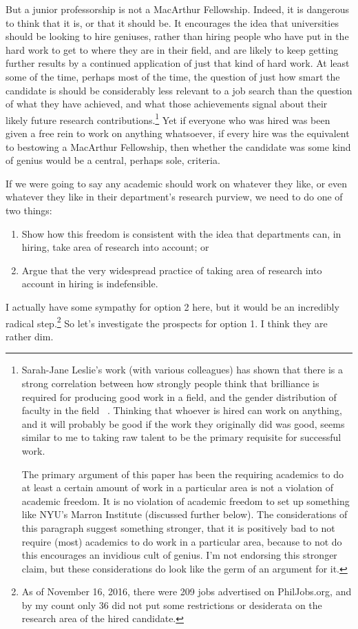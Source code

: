 But a junior professorship is not a MacArthur Fellowship. Indeed, it is dangerous to think that it is, or that it should be. It encourages the idea that universities should be looking to hire geniuses, rather than hiring people who have put in the hard work to get to where they are in their field, and are likely to keep getting further results by a continued application of just that kind of hard work. At least some of the time, perhaps most of the time, the question of just how smart the candidate is should be considerably less relevant to a job search than the question of what they have achieved, and what those achievements signal about their likely future research contributions.\footnote{Sarah-Jane Leslie's work (with various colleagues) has shown that there is a strong correlation between how strongly people think that brilliance is required for producing good work in a field, and the gender distribution of faculty in the field ~\citep{LeslieScience2015, LeslieFrontiers2015, LesliePLOS2016}. Thinking that whoever is hired can work on anything, and it will probably be good if the work they originally did was good, seems similar to me to taking raw talent to be the primary requisite for successful work.

The primary argument of this paper has been the requiring academics to do at least a certain amount of work in a particular area is not a violation of academic freedom. It is no violation of academic freedom to set up something like NYU's Marron Institute (discussed further below). The considerations of this paragraph suggest something stronger, that it is positively bad to not require (most) academics to do work in a particular area, because to not do this encourages an invidious cult of genius. I'm not endorsing this stronger claim, but these considerations do look like the germ of an argument for it.} Yet if everyone who was hired was been given a free rein to work on anything whatsoever, if every hire was the equivalent to bestowing a MacArthur Fellowship, then whether the candidate was some kind of genius would be a central, perhaps sole, criteria.

If we were going to say any academic should work on whatever they like, or even whatever they like in their department's research purview, we need to do one of two things:

\begin{enumerate}
\item Show how this freedom is consistent with the idea that departments can, in hiring, take area of research into account; or

\item Argue that the very widespread practice of taking area of research into account in hiring is indefensible.

\end{enumerate}
I actually have some sympathy for option 2 here, but it would be an incredibly radical step.\footnote{As of November 16, 2016, there were 209 jobs advertised on PhilJobs.org, and by my count only 36 did not put some restrictions or desiderata on the research area of the hired candidate.} So let's investigate the prospects for option 1. I think they are rather dim.

